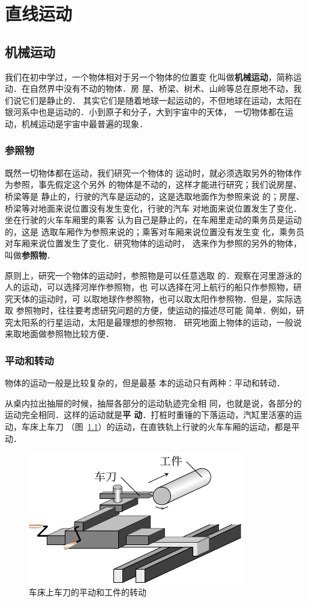 \chapter{直线运动}\label{chapter-rectilinear-motion}

\section{机械运动}
 我们在初中学过，一个物体相对于另一个物体的位置变
化叫做\textbf{机械运动}，简称运动．在自然界中没有不动的物体．房
屋、桥梁、树术、山岭等总在原地不动，我们说它们是静止的．
其实它们是随着地球一起运动的，不但地球在运动，太阳在
银河系中也是运动的．小到原子和分子，大到宇宙中的天体，
一切物体都在运动，机械运动是宇宙中最普遍的现象．

\subsection{参照物} 

既然一切物体都在运动，我们研究一个物体的
运动时，就必须选取另外的物体作为参照，事先假定这个另外
的物体是不动的，这样才能进行研究；我们说房屋、桥梁等是
静止的，行驶的汽车是运动的，这是选取地面作为参照来说
的；房屋、桥梁等对地面来说位置没有发生变化，行驶的汽车
对地面来说位置发生了变化．坐在行驶的火车车厢里的乘客
认为自己是静止的，在车厢里走动的乘务员是运动的，这是
选取车厢作为参照来说的；乘客对车厢来说位置没有发生变
化，乘务员对车厢来说位置发生了变化．研究物体的运动时，
选来作为参照的另外的物体，叫做\textbf{参照物}．

    原则上，研究一个物体的运动时，参照物是可以任意选取
的．观察在河里游泳的人的运动，可以选择河岸作参照物，也
可以选择在河上航行的船只作参照物，研究天体的运动时，可
以取地球作参照物，也可以取太阳作参照物．但是，实际选取
参照物时，往往要考虑研究问题的方便，使运动的描述尽可能
简单．例如，研究太阳系的行星运动，太阳是最理想的参照物．
研究地面上物体的运动，一般说来取地面做参照物比较方便．

\subsection{平动和转动} 
 物体的运动一般是比较复杂的，但是最基
本的运动只有两种：平动和转动．

    从桌内拉出抽屉的时候，抽屉各部分的运动轨迹完全相
同，也就是说，各部分的运动完全相同．这样的运动就是\textbf{平
动}．打桩时重锤的下落运动，汽缸里活塞的运动，车床上车刀
（图~\ref{fig_A_2-1}）的运动，在直铁轨上行驶的火车车厢的运动，都是平
动．
\begin{figure}[htp]
\centering
\includegraphics{fig/A/2-1.pdf}
\caption{车床上车刀的平动和工件的转动}\label{fig_A_2-1}
\end{figure}

